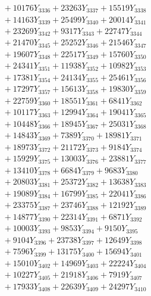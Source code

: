 \documentclass[a4paper,10pt]{article}
\begin{document}
{\begin{align}
&\;  + 10176 Y_{3336} + 23263 Y_{3337} + 15519 Y_{3338} \\[0.3ex]
&\;  + 14163 Y_{3339} + 25499 Y_{3340} + 20014 Y_{3341} \\[0.3ex]
&\;  + 23269 Y_{3342} + 9317 Y_{3343} + 22747 Y_{3344} \\[0.3ex]
&\;  + 21470 Y_{3345} + 25252 Y_{3346} + 21546 Y_{3347} \\[0.3ex]
&\;  + 19607 Y_{3348} + 22517 Y_{3349} + 15760 Y_{3350} \\[0.3ex]
&\;  + 24341 Y_{3351} + 11938 Y_{3352} + 10982 Y_{3353} \\[0.3ex]
&\;  + 17381 Y_{3354} + 24134 Y_{3355} + 25461 Y_{3356} \\[0.3ex]
&\;  + 17297 Y_{3357} + 15613 Y_{3358} + 19830 Y_{3359} \\[0.5ex]\allowbreak
&\;  + 22759 Y_{3360} + 18551 Y_{3361} + 6841 Y_{3362} \\[0.3ex]
&\;  + 10117 Y_{3363} + 12994 Y_{3364} + 19041 Y_{3365} \\[0.3ex]
&\;  + 10448 Y_{3366} + 18945 Y_{3367} + 25031 Y_{3368} \\[0.3ex]
&\;  + 14843 Y_{3369} + 7389 Y_{3370} + 18981 Y_{3371} \\[0.3ex]
&\;  + 18973 Y_{3372} + 21172 Y_{3373} + 9184 Y_{3374} \\[0.3ex]
&\;  + 15929 Y_{3375} + 13003 Y_{3376} + 23881 Y_{3377} \\[0.3ex]
&\;  + 13410 Y_{3378} + 6684 Y_{3379} + 9683 Y_{3380} \\[0.3ex]
&\;  + 20803 Y_{3381} + 25372 Y_{3382} + 13638 Y_{3383} \\[0.3ex]
&\;  + 19089 Y_{3384} + 16799 Y_{3385} + 22041 Y_{3386} \\[0.3ex]
&\;  + 23375 Y_{3387} + 23746 Y_{3388} + 12192 Y_{3389} \\[0.5ex]\allowbreak
&\;  + 14877 Y_{3390} + 22314 Y_{3391} + 6871 Y_{3392} \\[0.3ex]
&\;  + 10003 Y_{3393} + 9853 Y_{3394} + 9150 Y_{3395} \\[0.3ex]
&\;  + 9104 Y_{3396} + 23738 Y_{3397} + 12649 Y_{3398} \\[0.3ex]
&\;  + 7596 Y_{3399} + 13175 Y_{3400} + 15694 Y_{3401} \\[0.3ex]
&\;  + 15010 Y_{3402} + 14969 Y_{3403} + 22224 Y_{3404} \\[0.3ex]
&\;  + 10227 Y_{3405} + 21918 Y_{3406} + 7919 Y_{3407} \\[0.3ex]
&\;  + 17933 Y_{3408} + 22639 Y_{3409} + 24297 Y_{3410} \\[0.3ex]

\end{align}}
\end{document}
